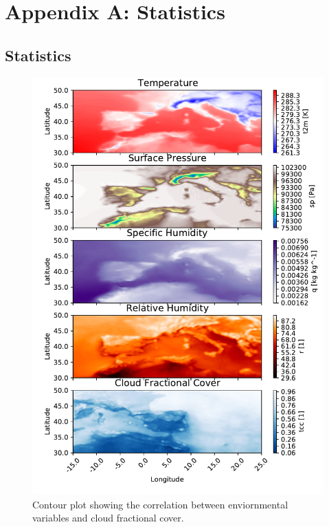 \appendix
\chapter{Appendix A: Statistics}
\section{Statistics}

\begin{figure}[ht]
    \centering
    \includegraphics{python_figs/contour_temporally_averaged.pdf}
    \caption{Contour plot showing the correlation between enviornmental variables and cloud fractional cover. }
    \label{fig:correlation_tcc_vs_envio}
\end{figure}

